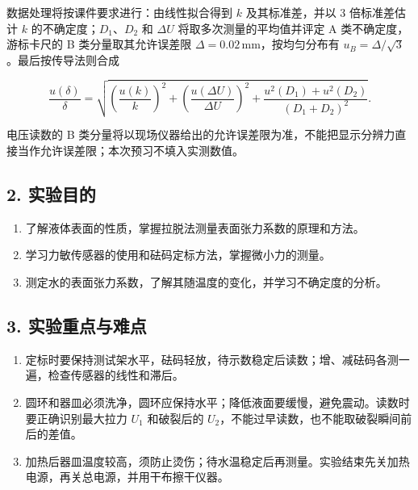 数据处理将按课件要求进行：由线性拟合得到 $k$ 及其标准差，并以 3 倍标准差估计 $k$ 的不确定度；$D_1$、$D_2$ 和 $\Delta U$ 将取多次测量的平均值并评定 A 类不确定度，游标卡尺的 B 类分量取其允许误差限 $\Delta=0.02\,\mathrm{mm}$，按均匀分布有 $u_B=\Delta/\sqrt3$。最后按传导法则合成

\[
\frac{u(\delta)}{\delta}=\sqrt{\left(\frac{u(k)}{k}\right)^{2}+\left(\frac{u(\Delta U)}{\Delta U}\right)^{2}+\frac{u^{2}(D_1)+u^{2}(D_2)}{(D_1+D_2)^{2}}}.
\]

电压读数的 B 类分量将以现场仪器给出的允许误差限为准，不能把显示分辨力直接当作允许误差限；本次预习不填入实测数值。

\subsection*{2. 实验目的}

\begin{enumerate}
\item 了解液体表面的性质，掌握拉脱法测量表面张力系数的原理和方法。
\item 学习力敏传感器的使用和砝码定标方法，掌握微小力的测量。
\item 测定水的表面张力系数，了解其随温度的变化，并学习不确定度的分析。

\end{enumerate}
\subsection*{3. 实验重点与难点}

\begin{enumerate}
\item 定标时要保持测试架水平，砝码轻放，待示数稳定后读数；增、减砝码各测一遍，检查传感器的线性和滞后。
\item 圆环和器皿必须洗净，圆环应保持水平；降低液面要缓慢，避免震动。读数时要正确识别最大拉力 $U_1$ 和破裂后的 $U_2$，不能过早读数，也不能取破裂瞬间前后的差值。
\item 加热后器皿温度较高，须防止烫伤；待水温稳定后再测量。实验结束先关加热电源，再关总电源，并用干布擦干仪器。

\end{enumerate}
